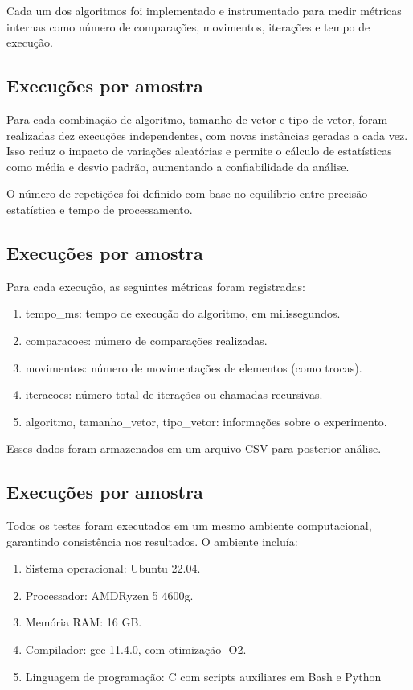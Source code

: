 Cada um dos algoritmos foi implementado e instrumentado para medir métricas internas como número de comparações, movimentos, iterações e tempo de execução.

\subsection{Execuções por amostra}
Para cada combinação de algoritmo, tamanho de vetor e tipo de vetor, foram realizadas dez execuções independentes, com novas instâncias geradas a cada vez. Isso reduz o impacto de variações aleatórias e permite o cálculo de estatísticas como média e desvio padrão, aumentando a confiabilidade da análise.

O número de repetições foi definido com base no equilíbrio entre precisão estatística e tempo de processamento.

\subsection{Execuções por amostra}
Para cada execução, as seguintes métricas foram registradas:

\begin{enumerate}
    \item tempo\_ms: tempo de execução do algoritmo, em milissegundos.
    \item comparacoes: número de comparações realizadas.
    \item movimentos: número de movimentações de elementos (como trocas).
    \item iteracoes: número total de iterações ou chamadas recursivas.
    \item algoritmo, tamanho\_vetor, tipo\_vetor: informações sobre o experimento.
\end{enumerate}

Esses dados foram armazenados em um arquivo CSV para posterior análise.

\subsection{Execuções por amostra}
Todos os testes foram executados em um mesmo ambiente computacional, garantindo consistência nos resultados. O ambiente incluía:

\begin{enumerate}
    \item Sistema operacional: Ubuntu 22.04.
    \item Processador: AMD\textregistered \text{ }Ryzen 5 4600g.
    \item Memória RAM: 16 GB.
    \item Compilador: gcc 11.4.0, com otimização -O2.
    \item Linguagem de programação: C com scripts auxiliares em Bash e Python
\end{enumerate}

